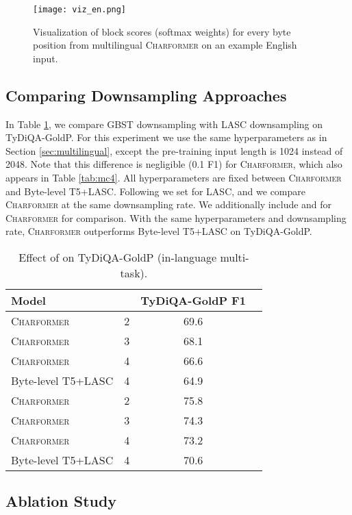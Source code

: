 \documentclass{article} \usepackage{iclr2022_conference,times}
\newcommand{\charformer}{\textsc{Charformer}\xspace}
\newcommand{\charformersmall}{\textsc{Charformer}\xspace}
\newcommand{\charformerbase}{\textsc{Charformer}\xspace}
\newcommand{\charformertall}{\textsc{Charformer}\xspace}
\newcommand{\canine}{Byte-level T5+LASC\xspace}
\newcommand{\caninesmall}{Byte-level T5+LASC\xspace}
\newcommand{\caninebase}{Byte-level T5+LASC\xspace}
\begin{document}
\begin{figure}[t] \centering
\texttt{[image: viz\_en.png]}
\caption{Visualization of block scores (softmax weights) for every byte position from multilingual \mbox{\charformertall} on an example English input.}
\label{fig:viz}
\end{figure}

\subsection{Comparing Downsampling Approaches} \label{sec:downsampling}
In Table \ref{tab:tydids}, we compare GBST downsampling with LASC downsampling \citep{clark2021canine} on TyDiQA-GoldP. For this experiment we use the same hyperparameters as in Section \ref{sec:multilingual}, except the pre-training input length is 1024 instead of 2048. Note that this difference is negligible (0.1 F1) for \charformerbase,  which also appears in Table \ref{tab:mc4}. All hyperparameters are fixed between \charformer and \canine. Following \citep{clark2021canine} we set  for LASC, and we compare \charformer at the same downsampling rate. We additionally include  and  for \charformer for comparison. With the same hyperparameters and downsampling rate, \charformer outperforms \canine on TyDiQA-GoldP.

\begin{table}[t]
\small
    \centering
    \caption{Effect of  on TyDiQA-GoldP (in-language multi-task).}
    \begin{tabular}{l c c c}
    \toprule
     Model &  & TyDiQA-GoldP F1 \\
     \midrule
     \charformersmall & 2 & 69.6 \\
     \charformersmall & 3 & 68.1 \\
     \charformersmall & 4 & 66.6 \\
     \caninesmall & 4 & 64.9 \\
     \midrule
     \charformerbase & 2 & 75.8 \\
     \charformerbase & 3 & 74.3 \\
     \charformerbase & 4 & 73.2 \\
     \caninebase & 4 & 70.6 \\
     \bottomrule
    \end{tabular}
    \label{tab:tydids}
\end{table}


\subsection{Ablation Study}
\end{document}
